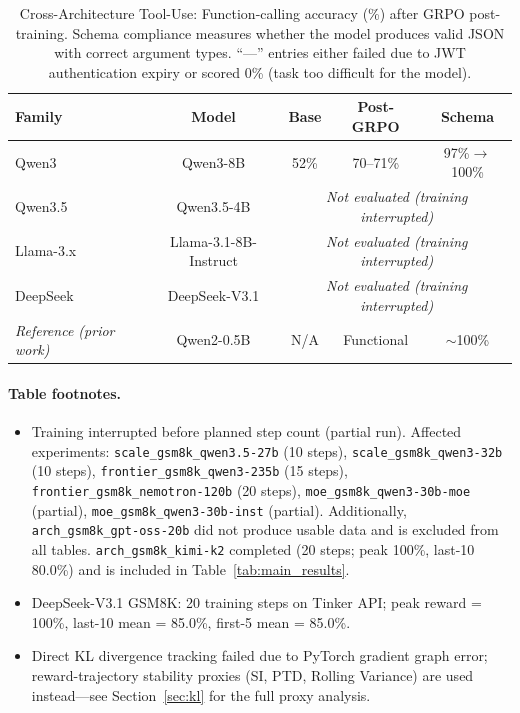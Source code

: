 \documentclass{article}
\begin{document}
\begin{table}[htbp]
\centering
\caption{Cross-Architecture Tool-Use: Function-calling accuracy (\%)
after GRPO post-training. Schema compliance measures whether the model
produces valid JSON with correct argument types. ``---'' entries either
failed due to JWT authentication expiry or scored 0\% (task too
difficult for the model).}
\label{tab:tool_use_cross_arch}
\small
\begin{tabular}{@{}lcccc@{}}
\toprule
\textbf{Family} & \textbf{Model} & \textbf{Base} & \textbf{Post-GRPO} & \textbf{Schema} \\
\midrule
Qwen3 & Qwen3-8B & 52\% & 70--71\% & 97\%$\to$100\% \\
Qwen3.5 & Qwen3.5-4B & \multicolumn{3}{c}{\textit{Not evaluated (training interrupted)}} \\
Llama-3.x & Llama-3.1-8B-Instruct & \multicolumn{3}{c}{\textit{Not evaluated (training interrupted)}} \\
DeepSeek & DeepSeek-V3.1 & \multicolumn{3}{c}{\textit{Not evaluated (training interrupted)}} \\
\midrule
\textit{Reference (prior work)} & Qwen2-0.5B & N/A & Functional & $\sim$100\% \\
\bottomrule
\end{tabular}
\end{table}

\paragraph{Table footnotes.}
\begin{itemize}
    \item[$^\dagger$] Training interrupted before planned step count (partial run).
    Affected experiments:
    \texttt{scale\_gsm8k\_qwen3.5-27b} (10 steps), \texttt{scale\_gsm8k\_qwen3-32b} (10 steps),
    \texttt{frontier\_gsm8k\_qwen3-235b} (15 steps), \texttt{frontier\_gsm8k\_nemotron-120b} (20 steps),
    \texttt{moe\_gsm8k\_qwen3-30b-moe} (partial), \texttt{moe\_gsm8k\_qwen3-30b-inst} (partial).
    Additionally, \texttt{arch\_gsm8k\_gpt-oss-20b} did not produce usable data and is excluded
    from all tables. \texttt{arch\_gsm8k\_kimi-k2} completed (20 steps; peak 100\%, last-10 80.0\%)
    and is included in Table~\ref{tab:main_results}.
    \item[$^b$] DeepSeek-V3.1 GSM8K: 20 training steps on Tinker API;
    peak reward = 100\%, last-10 mean = 85.0\%, first-5 mean = 85.0\%.
    \item[$^h$] Direct KL divergence tracking failed due to PyTorch gradient graph error;
    reward-trajectory stability proxies (SI, PTD, Rolling Variance) are used
    instead---see Section~\ref{sec:kl} for the full proxy analysis.
\end{itemize}
\end{document}
